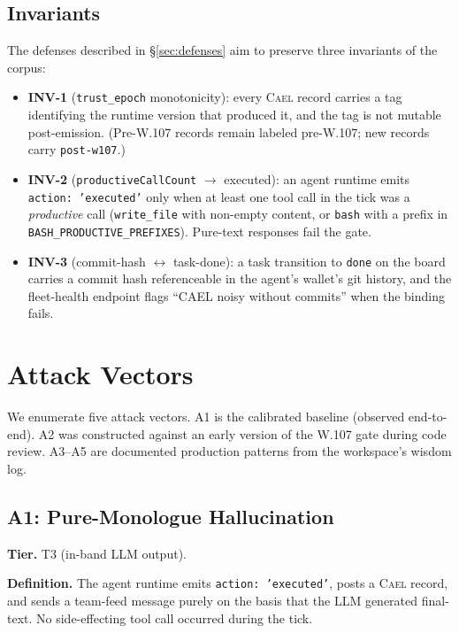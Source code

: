 \documentclass[letterpaper,twocolumn,10pt]{article}
\newcommand{\cael}{\textsc{Cael}}
\newcommand{\trustepoch}{\texttt{trust\_epoch}}
\begin{document}
\subsection{Invariants}

The defenses described in \S\ref{sec:defenses} aim to preserve three
invariants of the corpus:
\begin{itemize}[topsep=2pt,itemsep=1pt]
\item \textbf{INV-1} (\trustepoch{} monotonicity): every \cael{}
record carries a tag identifying the runtime version that produced it,
and the tag is not mutable post-emission. (Pre-W.107 records remain
labeled pre-W.107; new records carry \texttt{post-w107}.)
\item \textbf{INV-2} (\texttt{productiveCallCount} $\rightarrow$
executed): an agent runtime emits \texttt{action: 'executed'} only
when at least one tool call in the tick was a \emph{productive} call
(\texttt{write\_file} with non-empty content, or \texttt{bash} with a
prefix in \texttt{BASH\_PRODUCTIVE\_PREFIXES}). Pure-text responses
fail the gate.
\item \textbf{INV-3} (commit-hash $\leftrightarrow$ task-done): a
task transition to \texttt{done} on the board carries a commit hash
referenceable in the agent's wallet's git history, and the
fleet-health endpoint flags ``CAEL noisy without commits'' when the
binding fails.
\end{itemize}

\section{Attack Vectors}
\label{sec:attacks}

We enumerate five attack vectors. A1 is the calibrated baseline
(observed end-to-end). A2 was constructed against an early version of
the W.107 gate during code review. A3--A5 are documented production
patterns from the workspace's wisdom log.

\subsection{A1: Pure-Monologue Hallucination}
\label{sec:a1}

\textbf{Tier.} T3 (in-band LLM output).

\textbf{Definition.} The agent runtime emits \texttt{action:
'executed'}, posts a \cael{} record, and sends a team-feed message
purely on the basis that the LLM generated final-text. No
side-effecting tool call occurred during the tick.
\end{document}

